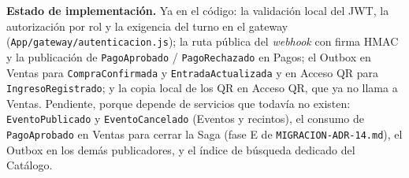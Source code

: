 \textbf{Estado de implementación.} Ya en el código: la validación local del JWT,
la autorización por rol y la exigencia del turno en el gateway
(\texttt{App/gateway/autenticacion.js}); la ruta pública del \textit{webhook}
con firma HMAC y la publicación de \texttt{PagoAprobado} /
\texttt{PagoRechazado} en Pagos; el Outbox en Ventas para
\texttt{CompraConfirmada} y \texttt{EntradaActualizada} y en Acceso QR para
\texttt{IngresoRegistrado}; y la copia local de los QR en Acceso QR, que ya no
llama a Ventas. Pendiente, porque depende de
servicios que todavía no existen: \texttt{EventoPublicado} y
\texttt{EventoCancelado} (Eventos y recintos), el consumo de
\texttt{PagoAprobado} en Ventas para cerrar la Saga (fase E de
\texttt{MIGRACION-ADR-14.md}), el Outbox en los demás publicadores, y el índice
de búsqueda dedicado del Catálogo.
